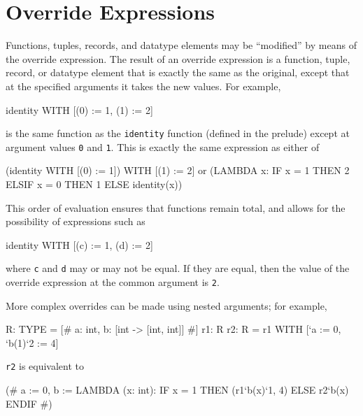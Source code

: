 \section{Override Expressions}

Functions, tuples, records, and datatype elements may be ``modified'' by
means of the override expression.  The result of an override expression is
a function, tuple, record, or datatype element that is exactly the same as
the original, except that at the specified arguments it takes the new
values.  For example,
\begin{pvsex}
  identity WITH [(0) := 1, (1) := 2]
\end{pvsex}
%
is the same function as the \texttt{identity} function (defined in the
prelude) except at argument values \texttt{0} and \texttt{1}.  This is exactly
the same expression as either of
\begin{pvsex}
  (identity WITH [(0) := 1]) WITH [(1) := 2] {\rm or}
  (LAMBDA x: IF x = 1 THEN 2 ELSIF x = 0 THEN 1 ELSE identity(x))
\end{pvsex}

This order of evaluation ensures that functions remain total, and allows
for the possibility of expressions such as
\begin{pvsex}
  identity WITH [(c) := 1, (d) := 2]
\end{pvsex}
where \texttt{c} and \texttt{d} may or may not be equal.  If they are
equal, then the value of the override expression at the common argument is
\texttt{2}.

More complex overrides can be made using nested arguments; for example,
\begin{pvsex}
  R: TYPE = [# a: int, b: [int -> [int, int]] #]
  r1: R
  r2: R = r1 WITH [`a := 0, `b(1)`2 := 4]
\end{pvsex}
{\tt r2} is equivalent to
\begin{pvsex}
  (# a := 0,
     b := LAMBDA (x: int):
           IF x = 1
           THEN (r1`b(x)`1, 4)
           ELSE r2`b(x)
           ENDIF #)
\end{pvsex}

